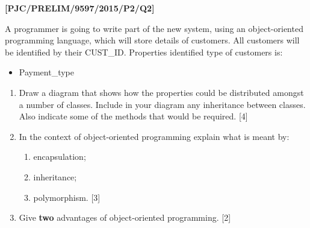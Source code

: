 \item \textbf{{[}PJC/PRELIM/9597/2015/P2/Q2{]} }

A programmer is going to write part of the new system, using an object-oriented
programming language, which will store details of customers. All customers
will be identified by their CUST\_ID. Properties identified type of
customers is: 
\begin{itemize}
\item Payment\_type 
\end{itemize}
\begin{enumerate}
\item Draw a diagram that shows how the properties could be distributed
amongst a number of classes. Include in your diagram any inheritance
between classes. Also indicate some of the methods that would be required.
\hfill{}{[}4{]} 
\item In the context of object-oriented programming explain what is meant
by: 
\begin{enumerate}
\item encapsulation;
\item inheritance; 
\item polymorphism.\hfill{} {[}3{]}
\end{enumerate}
\item Give \textbf{two} advantages of object-oriented programming. \hfill{}{[}2{]}
\end{enumerate}